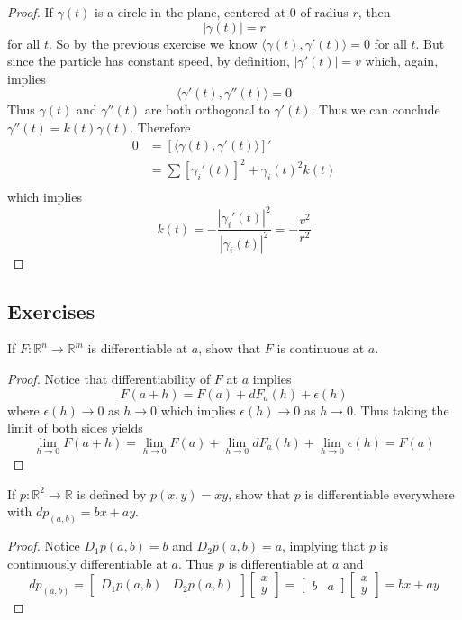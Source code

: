 \begin{proof}
If \( \gamma(t) \) is a circle in the plane, centered at \( 0 \) of radius \( r \), then 
\[
\left| \gamma(t) \right| =r
\]
for all \( t \). So by the previous exercise we know \( \langle \gamma(t), \gamma'(t) \rangle = 0 \) for all \( t \). But since the particle has constant speed, by definition, \( \left| \gamma'(t) \right| = v \) which, again, implies 
\[
\langle \gamma'(t), \gamma''(t) \rangle = 0
\]
Thus \( \gamma(t) \) and \( \gamma''(t) \) are both orthogonal to \( \gamma'(t) \). Thus we can conclude \( \gamma''(t) = k(t)\gamma(t) \). Therefore 
\begin{align*}
    0 &= \left[ \langle \gamma(t), \gamma'(t) \rangle \right]'\\
    &= \sum [\gamma_i'(t)]^2+\gamma_i(t)^2k(t) \\
\end{align*}
which implies
\[
k(t) = -\frac{\left| \gamma_i'(t) \right|^2}{\left| \gamma_i(t) \right|^2} = - \frac{v^2}{r^2}
\]
\end{proof}


\subsection*{Exercises}

\question If \( F: \mathbb{R}^n \rightarrow \mathbb{R}^m \) is differentiable at \( a \), show that \( F \) is continuous at \( a \).

\begin{proof}
Notice that differentiability of \( F \) at \( a \) implies
\[
F(a+h) = F(a) + dF_a(h)+\epsilon(h)
\]
where \( \epsilon(h) \rightarrow 0 \) as \( h \rightarrow 0 \) which implies \( \epsilon(h) \rightarrow 0 \) as \( h \rightarrow 0 \). Thus taking the limit of both sides yields 
\[
\lim_{h \rightarrow 0} F(a+h) = \lim_{h \rightarrow 0} F(a) + \lim_{h \rightarrow 0} dF_a(h) + \lim_{h \rightarrow 0} \epsilon(h) = F(a) 
\]
\end{proof}

\question If \( p: \mathbb{R}^2 \rightarrow \mathbb{R} \) is defined by \( p(x,y) = xy \), show that \( p \) is differentiable everywhere with \( dp_{(a,b)} = bx+ay \).

\begin{proof}
Notice \( D_1p(a,b) = b \) and \( D_2p(a,b) = a \), implying that \( p \) is continuously differentiable at \( a \). Thus \( p \) is differentiable at \( a \) and
\[
dp_{(a,b)} = \left[ \begin{array}{cc} D_1p(a,b) & D_2p(a,b)  \end{array} \right] \left[ \begin{array}{c} x \\ y \end{array} \right] = \left[ \begin{array}{cc} b & a  \end{array} \right] \left[ \begin{array}{c} x \\ y \end{array} \right] = bx+ay
\]
\end{proof}

